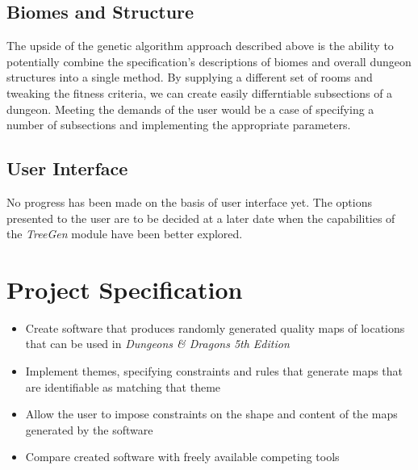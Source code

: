 \documentclass{article}
\begin{document}
\subsection{Biomes and Structure}
The upside of the genetic algorithm approach described above is the ability to potentially combine the specification's descriptions of biomes and overall dungeon structures into a single method. By supplying a different set of rooms and tweaking the fitness criteria, we can create easily differntiable subsections of a dungeon. Meeting the demands of the user would be a case of specifying a number of subsections and implementing the appropriate parameters.

\subsection{User Interface}
No progress has been made on the basis of user interface yet. The options presented to the user are to be decided at a later date when the capabilities of the \textit{TreeGen} module have been better explored. 


\pagebreak




\pagebreak

\appendix
\section{Project Specification}

\begin{itemize}
    \item Create software that produces randomly generated quality maps of locations that can be used in \textit{Dungeons \& Dragons 5th Edition}
    \item Implement themes, specifying constraints and rules that generate maps that are identifiable as matching that theme
    \item Allow the user to impose constraints on the shape and content of the maps generated by the software
    \item Compare created software with freely available competing tools
\end{itemize}
\end{document}
